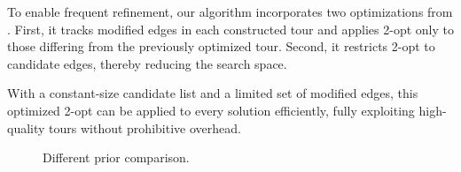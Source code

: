 \documentclass[a4paper,conference]{IEEEtran}
\begin{document}
To enable frequent refinement, our algorithm incorporates two optimizations from \cite{FACO2022}. First, it tracks modified edges in each constructed tour and applies 2-opt only to those differing from the previously optimized tour. Second, it restricts 2-opt to candidate edges, thereby reducing the search space.

With a constant-size candidate list and a limited set of modified edges, this optimized 2-opt can be applied to every solution efficiently, fully exploiting high-quality tours without prohibitive overhead.

\begin{figure}[!htb]
  \centering


  \caption{Different prior comparison.}
  \label{fig:NAR}
\end{figure}
\end{document}
